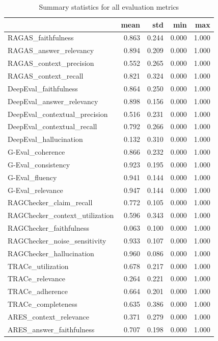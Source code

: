 \begin{table}
\caption{Summary statistics for all evaluation metrics}
\label{tab:summary}
\begin{tabular}{lrrrr}
\toprule
 & mean & std & min & max \\
\midrule
RAGAS_faithfulness & 0.863 & 0.244 & 0.000 & 1.000 \\
RAGAS_answer_relevancy & 0.894 & 0.209 & 0.000 & 1.000 \\
RAGAS_context_precision & 0.552 & 0.265 & 0.000 & 1.000 \\
RAGAS_context_recall & 0.821 & 0.324 & 0.000 & 1.000 \\
DeepEval_faithfulness & 0.864 & 0.250 & 0.000 & 1.000 \\
DeepEval_answer_relevancy & 0.898 & 0.156 & 0.000 & 1.000 \\
DeepEval_contextual_precision & 0.516 & 0.231 & 0.000 & 1.000 \\
DeepEval_contextual_recall & 0.792 & 0.266 & 0.000 & 1.000 \\
DeepEval_hallucination & 0.132 & 0.310 & 0.000 & 1.000 \\
G-Eval_coherence & 0.866 & 0.232 & 0.000 & 1.000 \\
G-Eval_consistency & 0.923 & 0.195 & 0.000 & 1.000 \\
G-Eval_fluency & 0.941 & 0.144 & 0.000 & 1.000 \\
G-Eval_relevance & 0.947 & 0.144 & 0.000 & 1.000 \\
RAGChecker_claim_recall & 0.772 & 0.105 & 0.000 & 1.000 \\
RAGChecker_context_utilization & 0.596 & 0.343 & 0.000 & 1.000 \\
RAGChecker_faithfulness & 0.063 & 0.100 & 0.000 & 1.000 \\
RAGChecker_noise_sensitivity & 0.933 & 0.107 & 0.000 & 1.000 \\
RAGChecker_hallucination & 0.960 & 0.086 & 0.000 & 1.000 \\
TRACe_utilization & 0.678 & 0.217 & 0.000 & 1.000 \\
TRACe_relevance & 0.264 & 0.221 & 0.000 & 1.000 \\
TRACe_adherence & 0.664 & 0.201 & 0.000 & 1.000 \\
TRACe_completeness & 0.635 & 0.386 & 0.000 & 1.000 \\
ARES_context_relevance & 0.371 & 0.279 & 0.000 & 1.000 \\
ARES_answer_faithfulness & 0.707 & 0.198 & 0.000 & 1.000 \\

\end{tabular}
\end{table}
